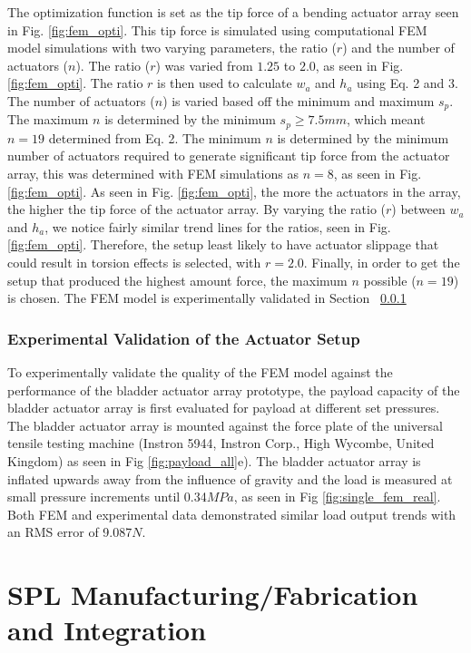 \documentclass[letterpaper, 10 pt, conference]{ieeeconf}  %
\begin{document}
The optimization function is set as the tip force of a bending actuator array seen in Fig. \ref{fig:fem_opti}. This tip force is simulated using computational FEM model simulations with two varying parameters, the ratio ($r$) and the number of actuators ($n$). The ratio ($r$) was varied from $1.25$ to $2.0$, as seen in Fig. \ref{fig:fem_opti}. The ratio $r$ is then used to calculate $w_a$ and $h_a$ using Eq. 2 and 3. The number of actuators ($n$) is varied based off the minimum and maximum $s_p$. The maximum $n$ is determined by the minimum $s_p \geq 7.5mm$, which meant $n = 19$ determined from Eq. 2. The minimum $n$ is determined by the minimum number of actuators required to generate significant tip force from the actuator array, this was determined with FEM simulations as $n = 8$, as seen in Fig. \ref{fig:fem_opti}. As seen in Fig. \ref{fig:fem_opti}, the more the actuators in the array, the higher the tip force of the actuator array. By varying the ratio ($r$) between $w_a$ and $h_a$, we notice fairly similar trend lines for the ratios, seen in Fig. \ref{fig:fem_opti}. Therefore, the setup least likely to have actuator slippage that could result in torsion effects is selected, with $r =2.0$. Finally, in order to get the setup that produced the highest amount force, the maximum $n$ possible ($n = 19$) is chosen. The FEM model is experimentally validated in Section ~\ref{sec:act_array_fem_real}

\subsubsection{Experimental Validation of the Actuator Setup}
\label{sec:act_array_fem_real}
To experimentally validate the quality of the FEM model against the performance of the bladder actuator array prototype, the payload capacity of the bladder actuator array is first evaluated for payload at different set pressures. The bladder actuator array is mounted against the force plate of the universal tensile testing machine (Instron 5944, Instron Corp., High Wycombe, United Kingdom) as seen in Fig \ref{fig:payload_all}e). The bladder actuator array is inflated upwards away from the influence of gravity and the load is measured at small pressure increments until 0.34$MPa$, as seen in Fig \ref{fig:single_fem_real}. Both FEM and experimental data demonstrated similar load output trends with an RMS error of 9.087$N$. 


\section{SPL Manufacturing/Fabrication and Integration}
\end{document}
